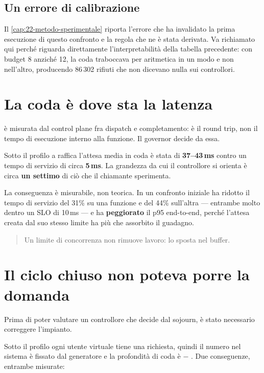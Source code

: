 \subsection{Un errore di calibrazione}

Il \cref{cap:22-metodo-sperimentale} riporta l'errore che ha invalidato la prima
esecuzione di questo confronto e la regola che ne \`e stata derivata. Va
richiamato qui perch\'e riguarda direttamente l'interpretabilit\`a della tabella
precedente: con budget 8 anzich\'e 12, la coda traboccava per aritmetica in un
modo e non nell'altro, producendo 86\,302 rifiuti che non dicevano nulla sui
controllori.

\section{La coda \`e dove sta la latenza}

 \`e misurata dal control plane fra dispatch e
completamento: \`e il round trip, non il tempo di esecuzione interno alla
funzione. Il governor decide da essa.

Sotto il profilo a raffica l'attesa media in coda \`e stata di \textbf{37--43\,ms}
contro un tempo di servizio di circa \textbf{5\,ms}. La grandezza da cui il
controllore si orienta \`e circa \textbf{un settimo} di ci\`o che il chiamante
sperimenta.

La conseguenza \`e misurabile, non teorica. In un confronto iniziale
 ha ridotto il tempo di servizio del 31\% su una funzione e del
44\% sull'altra --- entrambe molto dentro un SLO di 10\,ms --- e ha
\textbf{peggiorato} il p95 end-to-end, perch\'e l'attesa creata dal suo stesso
limite ha pi\`u che assorbito il guadagno.

\begin{quote}
Un limite di concorrenza non rimuove lavoro: lo sposta nel buffer.
\end{quote}

\section{Il ciclo chiuso non poteva porre la domanda}

Prima di poter valutare un controllore che decide dal sojourn, \`e stato
necessario correggere l'impianto.

Sotto il profilo  ogni utente virtuale tiene una richiesta, quindi
il numero nel sistema \`e fissato dal generatore e la profondit\`a di coda \`e
 $-$ . Due conseguenze, entrambe misurate:

